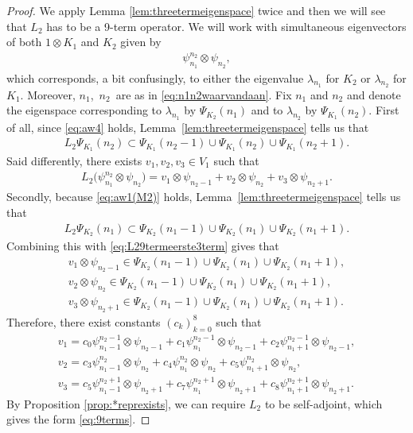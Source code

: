 \documentclass[10pt,a4paper]{amsart}
\numberwithin{equation}{section}
\begin{document}
\begin{proof}We apply Lemma \ref{lem:threetermeigenspace} twice and then we will see that $L_2$ has to be a 9-term operator. We will work with simultaneous eigenvectors of both $1\otimes K_1$ and $K_2$ given by
	\begin{gather*}
		\psi_{n_1}^{n_2}\otimes \psi_{n_2},
	\end{gather*}
	which corresponds, a bit confusingly, to either the eigenvalue $\lambda_{n_1}$ for $K_2$ or $\lambda_{n_2}$ for $K_1$. Moreover, $n_1$,~$n_2$~are as in \eqref{eq:n1n2waarvandaan}. Fix $n_1$ and $n_2$ and denote the eigenspace corresponding to $\lambda_{n_1}$ by $\Psi_{K_2}(n_1)$ and to $\lambda_{n_2}$ by $\Psi_{K_1}(n_2)$. First of all, since \eqref{eq:aw4} holds, Lemma~\ref{lem:threetermeigenspace} tells us that
	\begin{gather*}
		L_2 \Psi_{K_1}(n_2)\subset \Psi_{K_1}(n_2-1)\cup \Psi_{K_1}(n_2)\cup\Psi_{K_1}(n_2+1).
	\end{gather*}	
	Said differently, there exists $v_{1},v_2,v_3\in V_1$ such that
	\begin{gather}
		L_2 \big(\psi_{n_1}^{n_2}\otimes \psi_{n_2}\big)= v_1 \otimes \psi_{n_2-1}+v_2 \otimes \psi_{n_2}+v_3 \otimes \psi_{n_2+1}.\label{eq:L29termeerste3term}
	\end{gather}	
	Secondly, because \eqref{eq:aw1(M2)} holds, Lemma~\ref{lem:threetermeigenspace} tells us that
	\begin{gather*}
		L_2 \Psi_{K_2}(n_1)\subset \Psi_{K_2}(n_1-1)\cup \Psi_{K_2}(n_1)\cup\Psi_{K_2}(n_1+1).
	\end{gather*}	
	Combining this with \eqref{eq:L29termeerste3term} gives that
	\begin{gather*}
		v_1\otimes \psi_{n_2-1}\in \Psi_{K_2}(n_1-1)\cup \Psi_{K_2}(n_1)\cup\Psi_{K_2}(n_1+1),\\
		v_2\otimes \psi_{n_2} \in \Psi_{K_2}(n_1-1)\cup \Psi_{K_2}(n_1)\cup\Psi_{K_2}(n_1+1),\\
		v_3\otimes \psi_{n_2+1} \in \Psi_{K_2}(n_1-1)\cup \Psi_{K_2}(n_1)\cup\Psi_{K_2}(n_1+1).
	\end{gather*}
	Therefore, there exist constants $(c_k)_{k=0}^8$ such that
	\begin{gather*}
		v_1 = c_0 \psi_{n_1-1}^{n_2-1}\otimes \psi_{n_2-1} + c_1 \psi_{n_1}^{n_2-1}\otimes \psi_{n_2-1} +c_2 \psi_{n_1+1}^{n_2-1}\otimes \psi_{n_2-1},\\
		v_2 = c_3 \psi_{n_1-1}^{n_2}\otimes \psi_{n_2} + c_4 \psi_{n_1}^{n_2}\otimes \psi_{n_2} +c_5 \psi_{n_1+1}^{n_2}\otimes \psi_{n_2},\\
		v_3 = c_5 \psi_{n_1-1}^{n_2+1}\otimes \psi_{n_2+1} + c_7 \psi_{n_1}^{n_2+1}\otimes \psi_{n_2+1} +c_8 \psi_{n_1+1}^{n_2+1}\otimes \psi_{n_2+1}.
	\end{gather*}
	By Proposition \ref{prop:*reprexists}, we can require $L_2$ to be self-adjoint, which gives the form \eqref{eq:9terms}.
\end{proof}
\end{document}
